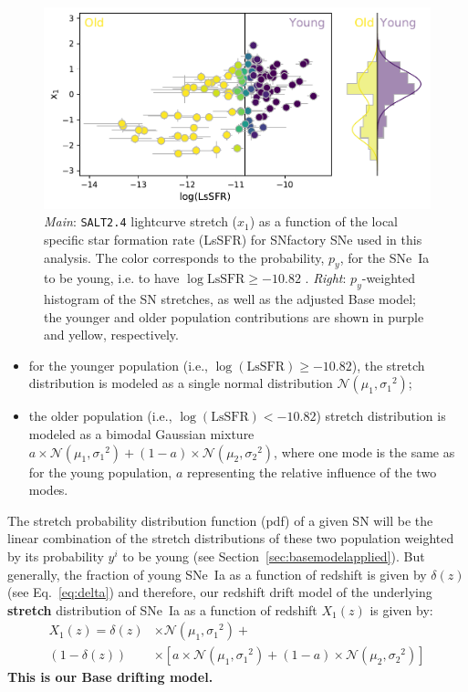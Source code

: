 \documentclass[referee]{aa}
\begin{document}
\begin{figure}
    \centering
    \includegraphics[width=0.8\linewidth]{Article_figures/model_base_hist.pdf}
    \caption{\textit{Main}: \textsc{\texttt{SALT2.4}} lightcurve stretch ($x_1$)
        as a function of the local specific star formation rate (LsSFR) for
        SNfactory SNe used in this analysis. The color corresponds to the
        probability, $p_y$, for the SNe~Ia to be young, i.e. to have
        $\log\mathrm{LsSFR} \geq -10.82$ \citep[see][]{rigault2020}.
        \textit{Right}: $p_y$-weighted histogram of the SN stretches, as well as
        the adjusted Base model; the younger and older population contributions
        are shown in purple and yellow, respectively.}
    \label{fig:stretchlssfr}
\end{figure}

\begin{itemize}
    \item for the younger population (i.e., $\log(\mathrm{LsSFR})\geq-10.82$),
        the stretch distribution is modeled as a single normal distribution
        $\mathcal{N}(\mu_1, \sigma_1{}^2)$; 
    \item the older population (i.e., $\log( \mathrm{LsSFR})<-10.82$) stretch
        distribution is modeled as a bimodal Gaussian mixture $a\times
        \mathcal{N}(\mu_1, \sigma_1{}^2) + (1-a)\times \mathcal{N}(\mu_2,
        \sigma_2{}^2)$, where one mode is the same as for the young population,
        $a$ representing the relative influence of the two modes.
\end{itemize}

The stretch probability distribution function (pdf) of a given SN will be the
linear combination of the stretch distributions of these two population weighted
by its probability $y^i$ to be young (see Section~\ref{sec:basemodelapplied}).
But generally, the fraction of young SNe~Ia as a function of redshift is given
by $\delta(z)$ (see Eq.~\ref{eq:delta}) and therefore, our redshift drift model
of the underlying \textbf{stretch} distribution of SNe~Ia as a function of redshift $X_1(z)$ is
given by:
\begin{align}\label{eq:stretchz}
    X_1(z) = \delta(z)&\times \mathcal{N}(\mu_1,\sigma_1{}^2) + \nonumber \\
    (1-\delta(z))&\times \left[ a\times\mathcal{N}(\mu_1,\sigma_1{}^2) +
    (1-a)\times\mathcal{N}(\mu_2,\sigma_2{}^2) \right]
\end{align}
\textbf{This is our Base drifting model.}
\end{document}
